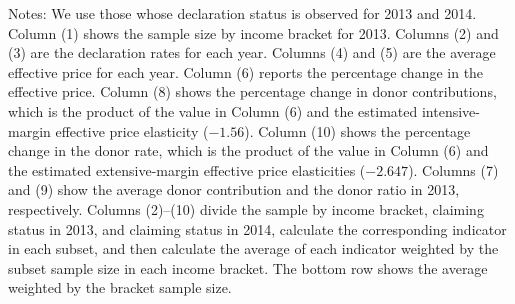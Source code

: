 \begin{table}
\begin{threeparttable}
\begin{tablenotes}
\item Notes: We use those whose declaration status is observed for 2013 and 2014. Column (1) shows the sample size by income bracket for 2013. Columns (2) and (3) are the declaration rates for each year. Columns (4) and (5) are the average effective price for each year. Column (6) reports the percentage change in the effective price. Column (8) shows the percentage change in donor contributions, which is the product of the value in Column (6) and the estimated intensive-margin effective price elasticity ($-1.56$). Column (10) shows the percentage change in the donor rate, which is the product of the value in Column (6) and the estimated extensive-margin effective price elasticities ($-2.647$). Columns (7) and (9) show the average donor contribution and the donor ratio in 2013, respectively. Columns (2)--(10) divide the sample by income bracket, claiming status in 2013, and claiming status in 2014, calculate the corresponding indicator in each subset, and then calculate the average of each indicator weighted by the subset sample size in each income bracket. The bottom row shows the average weighted by the bracket sample size.
\end{tablenotes}
\end{threeparttable}
\end{table}
